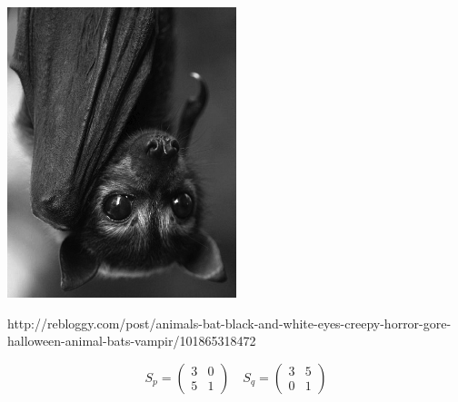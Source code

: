 \documentclass{beamer}
\begin{document}
\begin{frame}
    \begin{center}
    \includegraphics[width=0.5\textwidth]{static/vampire_bat.jpg}\vspace{.7cm}

    \scriptsize{http://rebloggy.com/post/animals-bat-black-and-white-eyes-creepy-horror-gore-halloween-animal-bats-vampir/101865318472}
    \end{center}
\end{frame}

\begin{frame}
    \begin{center}
    \LARGE{
        \begin{equation*}
            S_p =
            \begin{pmatrix}
                3 & 0  \\
                5 & 1
            \end{pmatrix}
            \quad
            S_q =
            \begin{pmatrix}
                3 & 5  \\
                0 & 1
            \end{pmatrix}
        \end{equation*}}
    \end{center}
\end{frame}

\begin{frame}
    \begin{center}
    
    \end{center}
\end{frame}
\end{document}
